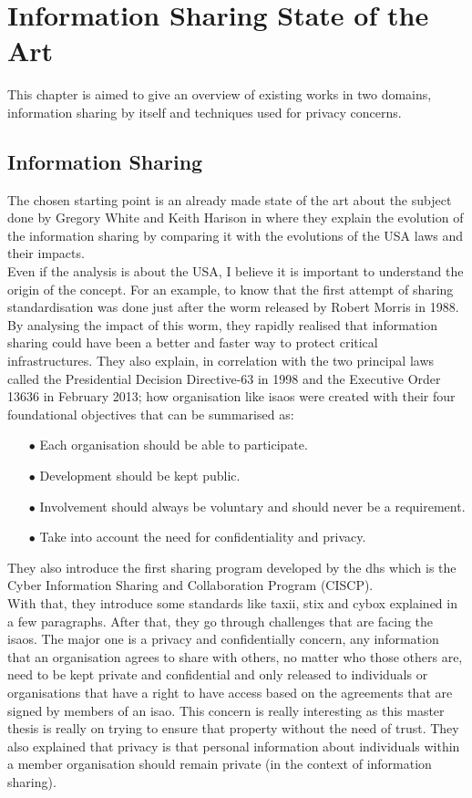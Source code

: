 \documentclass{eplmastersthesis}
\begin{document}
\chapter{Information Sharing State of the Art}

This chapter is aimed to give an overview of existing works in two domains, information sharing by itself and techniques used for privacy concerns.\\

\section{Information Sharing}
The chosen starting point is an already made state of the art about the subject done by Gregory White and Keith Harison in \cite{white2017state} where they explain the evolution of the information sharing by comparing it with the evolutions of the USA laws and their impacts.\\
Even if the analysis is about the USA, I believe it is important to understand the origin of the concept. For an example, to know that the first attempt of sharing standardisation was done just after the worm released by Robert Morris in 1988.\\
By analysing the impact of this worm, they rapidly realised that information sharing could have been a better and faster way to protect critical infrastructures. They also explain, in correlation with the two principal laws called the Presidential Decision Directive-63 in 1998 and the Executive Order 13636 in February 2013; how organisation like \gls{isao}s were created with their four foundational objectives that can be summarised as:
\begin{itemize}
\item[$\bullet$] Each organisation should be able to participate.
\item[$\bullet$] Development should be kept public.
\item[$\bullet$] Involvement should always be voluntary and should never be a requirement.
\item[$\bullet$] Take into account the need for confidentiality and privacy.
\end{itemize}
They also introduce the first sharing program developed by the \gls{dhs} which is the Cyber Information Sharing and Collaboration Program (CISCP).\\
With that, they introduce some standards like \gls{taxii}, \gls{stix} and \gls{cybox} explained in a few paragraphs. After that, they go through challenges that are facing the \gls{isao}s. The major one is a privacy and confidentially concern, any information that an organisation agrees to share with others, no matter who those others are, need to be kept private and confidential and only released to individuals or organisations that have a right to have access based on the agreements that are signed by members of an \gls{isao}. This concern is really interesting as this master thesis is really on trying to ensure that property without the need of trust. They also explained that privacy is that personal information about individuals within a member organisation should remain private (in the context of information sharing).
\end{document}
